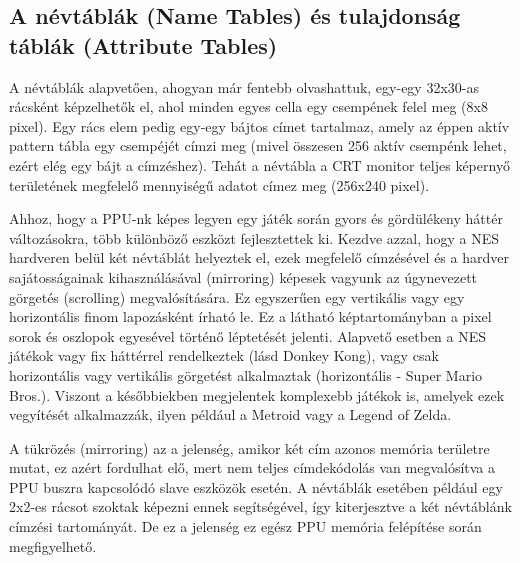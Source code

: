 	\subsection{A névtáblák (Name Tables) és tulajdonság táblák (Attribute Tables)}
	\label{sec:NT-AT-mirroring}
	
	A névtáblák alapvetően, ahogyan már fentebb olvashattuk, egy-egy 32x30-as rácsként képzelhetők el, ahol minden egyes cella egy csempének felel meg (8x8 pixel). Egy rács elem pedig egy-egy bájtos címet tartalmaz, amely az éppen aktív pattern tábla egy csempéjét címzi meg (mivel összesen 256 aktív csempénk lehet, ezért elég egy bájt a címzéshez). Tehát a névtábla a CRT monitor teljes képernyő területének megfelelő mennyiségű adatot címez meg (256x240 pixel). 
	
	Ahhoz, hogy a PPU-nk képes legyen egy játék során gyors és gördülékeny háttér változásokra, több különböző eszközt fejlesztettek ki. Kezdve azzal, hogy a NES hardveren belül két névtáblát helyeztek el, ezek megfelelő címzésével és a hardver sajátosságainak kihasználásával (mirroring) képesek vagyunk az úgynevezett görgetés (scrolling) megvalósítására. Ez egyszerűen egy vertikális vagy egy horizontális finom lapozásként írható le. Ez a látható képtartományban a pixel sorok és oszlopok egyesével történő léptetését jelenti. Alapvető esetben a NES játékok vagy fix háttérrel rendelkeztek (lásd Donkey Kong), vagy csak horizontális vagy vertikális görgetést alkalmaztak (horizontális - Super Mario Bros.). Viszont a későbbiekben megjelentek komplexebb játékok is, amelyek ezek vegyítését alkalmazzák, ilyen például a Metroid vagy a Legend of Zelda.
	
	A tükrözés (mirroring) az a jelenség, amikor két cím azonos memória területre mutat, ez azért fordulhat elő, mert nem teljes címdekódolás van megvalósítva a PPU buszra kapcsolódó slave eszközök esetén. A névtáblák esetében például egy 2x2-es rácsot szoktak képezni ennek segítségével, így kiterjesztve a két névtáblánk címzési tartományát. De ez a jelenség ez egész PPU memória felépítése során megfigyelhető.
	
